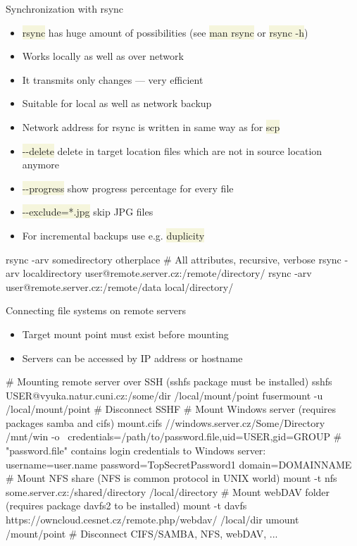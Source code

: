 \documentclass[compress, ucs, xelatex, 11pt, xcolor=svgnames, aspectratio=169,
	hyperref={
		bookmarks=true,
		unicode=true,
		colorlinks=true,
		pdftitle={Linux, command line and MetaCentrum},
		plainpages=false,
		pdfauthor={Vojtech Zeisek},
		pdfsubject={Course about use of Linux command line, writing shell scripts and using MetaCentrum of CESNET},
		pdfcreator={XeLaTeX},
		pdfkeywords={Linux, GNU, BASH, shell, command line, MetaCentrum},
		linkcolor=DarkRed, %
		anchorcolor=DarkBlue, %
		citecolor=Indigo, %
		filecolor=NavyBlue, %
		menucolor=DarkMagenta, %
		urlcolor=DarkBlue, %
		pdftex},
	url={hyphens, lowtilde} %
	]{beamer}
\renewcommand{\texttt}[1]{\colorbox{Beige}{{\ttfamily #1}}}
\begin{document}
\begin{frame}[fragile]{Synchronization with rsync}
	\begin{itemize}
		\item \texttt{rsync} has huge amount of possibilities (see \texttt{man rsync} or \texttt{rsync -h})
		\item Works locally as well as over network
		\item It transmits only changes --- very efficient
		\item Suitable for local as well as network backup
		\item Network address for rsync is written in same way as for \texttt{scp}
		\item \texttt{-{-}delete} delete in target location files which are not in source location anymore
		\item \texttt{-{-}progress} show progress percentage for every file
		\item \texttt{-{-}exclude=*.jpg} skip JPG files
		\item For incremental backups use e.g. \texttt{duplicity}
	\end{itemize}
	\vfill
	\begin{bashcode}
    rsync -arv somedirectory otherplace # All attributes, recursive, verbose
    rsync -arv localdirectory user@remote.server.cz:/remote/directory/
    rsync -arv user@remote.server.cz:/remote/data local/directory/
	\end{bashcode}
\end{frame}

\begin{frame}[fragile]{Connecting file systems on remote servers}
	\label{netfs}
	\begin{itemize}
		\item Target mount point must exist before mounting
		\item Servers can be accessed by IP address or hostname
	\end{itemize}
	\vfill
	\begin{bashcode}
    # Mounting remote server over SSH (sshfs package must be installed)
    sshfs USER@vyuka.natur.cuni.cz:/some/dir /local/mount/point
    fusermount -u /local/mount/point # Disconnect SSHF
    # Mount Windows server (requires packages samba and cifs)
    mount.cifs //windows.server.cz/Some/Directory /mnt/win -o \
      credentials=/path/to/password.file,uid=USER,gid=GROUP
    # "password.file" contains login credentials to Windows server:
    username=user.name
    password=TopSecretPassword1
    domain=DOMAINNAME
    # Mount NFS share (NFS is common protocol in UNIX world)
    mount -t nfs some.server.cz:/shared/directory /local/directory
    # Mount webDAV folder (requires package davfs2 to be installed)
    mount -t davfs https://owncloud.cesnet.cz/remote.php/webdav/ /local/dir
    umount /mount/point # Disconnect CIFS/SAMBA, NFS, webDAV, ...
	\end{bashcode}
\end{frame}
\end{document}
